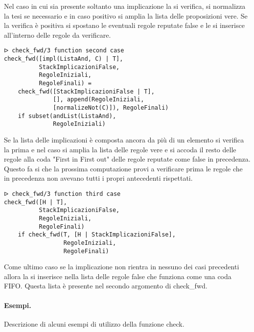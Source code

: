 \documentclass[12pt,twoside]{report}
\begin{document}
Nel caso in cui sia presente soltanto una implicazione la si verifica, si normalizza la tesi se necessario e in caso positivo si amplia la lista delle proposizioni vere. Se la verifica è positiva si spostano le eventuali regole reputate false e le si inserisce all'interno delle regole da verificare.

\begin{lstlisting}
ᐅ check_fwd/3 function second case 
check_fwd([impl(ListaAnd, C) | T], 
          StackImplicazioniFalse, 
          RegoleIniziali, 
          RegoleFinali) =
    check_fwd([StackImplicazioniFalse | T], 
              [], append(RegoleIniziali, 
              [normalizeNot(C)]), RegoleFinali) 
    if subset(andList(ListaAnd), 
              RegoleIniziali)
\end{lstlisting}

Se la lista delle implicazioni è composta ancora da più di un elemento si verifica la prima e nel caso si amplia la lista delle regole vere e si accoda il resto delle regole alla coda "First in First out" delle regole reputate come false in precedenza.
Questo fa si che la prossima computazione provi a verificare prima le regole che in precedenza non avevano tutti i propri antecedenti rispettati. 

\begin{lstlisting}
ᐅ check_fwd/3 function third case 
check_fwd([H | T], 
          StackImplicazioniFalse, 
          RegoleIniziali, 
          RegoleFinali) 
    if check_fwd(T, [H | StackImplicazioniFalse], 
                 RegoleIniziali, 
                 RegoleFinali)
\end{lstlisting}

Come ultimo caso se la implicazione non rientra in nessuno dei casi precedenti allora la si inserisce nella lista delle regole false che funziona come una coda FIFO. Questa lista è presente nel secondo argomento di check\_fwd.


\paragraph{Esempi.} Descrizione di alcuni esempi di utilizzo della funzione check.

\end{document}
